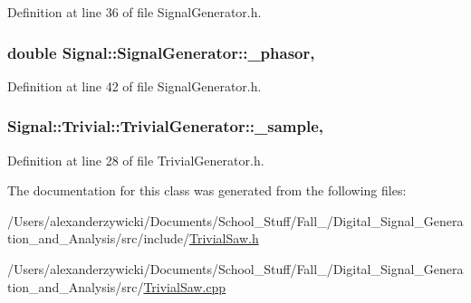 Definition at line 36 of file Signal\+Generator.\+h.

\hypertarget{classSignal_1_1SignalGenerator_af4aa0728ded00777be26a06d883eaeb3}{
\subsubsection[{\+\_\+phasor}]{\setlength{\rightskip}{0pt plus 5cm}double Signal\+::\+Signal\+Generator\+::\+\_\+phasor\hspace{0.3cm}{\ttfamily [protected]}, {\ttfamily [inherited]}}}\label{classSignal_1_1SignalGenerator_af4aa0728ded00777be26a06d883eaeb3}


Definition at line 42 of file Signal\+Generator.\+h.

\hypertarget{classSignal_1_1Trivial_1_1TrivialGenerator_a2e43e1ae605338b92e48974a681866e9}{
\subsubsection[{\+\_\+sample}]{ Signal\+::\+Trivial\+::\+Trivial\+Generator\+::\+\_\+sample\hspace{0.3cm}{\ttfamily [protected]}, {\ttfamily [inherited]}}}\label{classSignal_1_1Trivial_1_1TrivialGenerator_a2e43e1ae605338b92e48974a681866e9}


Definition at line 28 of file Trivial\+Generator.\+h.



The documentation for this class was generated from the following files\+:\begin{DoxyCompactItemize}
\item 
/\+Users/alexanderzywicki/\+Documents/\+School\+\_\+\+Stuff/\+Fall\+\_/\+Digital\+\_\+\+Signal\+\_\+\+Generation\+\_\+and\+\_\+\+Analysis/src/include/\hyperlink{TrivialSaw_8h}{Trivial\+Saw.\+h}\item 
/\+Users/alexanderzywicki/\+Documents/\+School\+\_\+\+Stuff/\+Fall\+\_/\+Digital\+\_\+\+Signal\+\_\+\+Generation\+\_\+and\+\_\+\+Analysis/src/\hyperlink{TrivialSaw_8cpp}{Trivial\+Saw.\+cpp}\end{DoxyCompactItemize}
